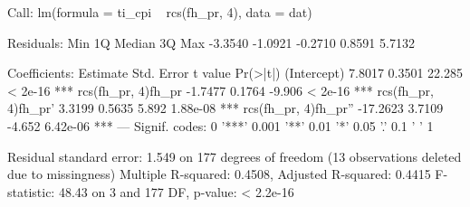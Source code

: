 \begin{Schunk}
\begin{Soutput}
Call:
lm(formula = ti_cpi ~ rcs(fh_pr, 4), data = dat)

Residuals:
    Min      1Q  Median      3Q     Max 
-3.3540 -1.0921 -0.2710  0.8591  5.7132 

Coefficients:
                     Estimate Std. Error t value Pr(>|t|)    
(Intercept)            7.8017     0.3501  22.285  < 2e-16 ***
rcs(fh_pr, 4)fh_pr    -1.7477     0.1764  -9.906  < 2e-16 ***
rcs(fh_pr, 4)fh_pr'    3.3199     0.5635   5.892 1.88e-08 ***
rcs(fh_pr, 4)fh_pr'' -17.2623     3.7109  -4.652 6.42e-06 ***
---
Signif. codes:  0 '***' 0.001 '**' 0.01 '*' 0.05 '.' 0.1 ' ' 1

Residual standard error: 1.549 on 177 degrees of freedom
  (13 observations deleted due to missingness)
Multiple R-squared:  0.4508,	Adjusted R-squared:  0.4415 
F-statistic: 48.43 on 3 and 177 DF,  p-value: < 2.2e-16
\end{Soutput}
\end{Schunk}
